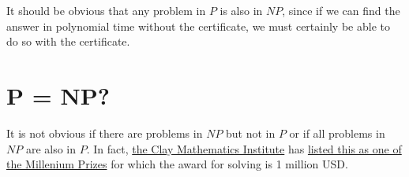 It should be obvious that any problem in $P$ is also in $NP$, since if
we can find the answer in polynomial time without the certificate, we
must certainly be able to do so with the certificate.

\section{P = NP?}

It is not obvious if there are problems in $NP$ but not in $P$ or if
all problems in $NP$ are also in $P$.  In fact,
\href{http://www.claymath.org/}{the Clay Mathematics Institute} has
\href{http://www.claymath.org/millennium/P_vs_NP/}{listed this as one
  of the Millenium Prizes} for which the award for solving is 1
million USD.
